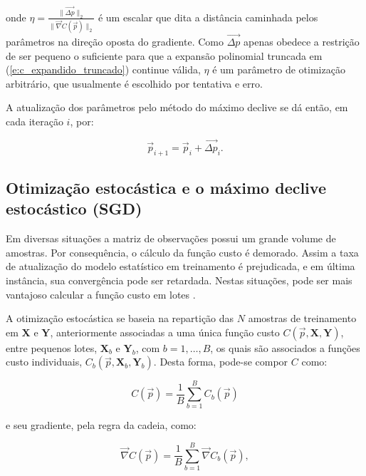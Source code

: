       \noindent onde $\eta = \frac{\|\vec{\Delta p}\|_2}{\|\vec{\nabla} C(\vec{p})\|_2}$ é um escalar que dita a distância caminhada pelos parâmetros na direção oposta do gradiente. Como $\vec{\Delta p}$ apenas obedece a restrição de ser pequeno o suficiente para que a expansão polinomial truncada em (\ref{e:c_expandido_truncado}) continue válida, $\eta$ é um parâmetro de otimização arbitrário, que usualmente é escolhido por tentativa e erro.

      A atualização dos parâmetros pelo método do máximo declive se dá então, em cada iteração $i$, por:

      \begin{equation} \label{e:pnew_maximo_declive}
        \vec{p}_{i+1} = \vec{p}_i + \vec{\Delta p}_i
        .
      \end{equation}


    \subsection{Otimização estocástica e o máximo declive estocástico (SGD)} \label{s:maximo_declive_estocastico}

      Em diversas situações a matriz de observações possui um grande volume de amostras. Por consequência, o cálculo da função custo é demorado. Assim a taxa de atualização do modelo estatístico em treinamento é prejudicada, e em última instância, sua convergência pode ser retardada. Nestas situações, pode ser mais vantajoso calcular a função custo em lotes .

      A otimização estocástica se baseia na repartição das $N$ amostras de treinamento em $\boldsymbol{X}$ e $\boldsymbol{Y}$, anteriormente associadas a uma única função custo $C(\vec{p}, \boldsymbol{X}, \boldsymbol{Y})$, entre pequenos lotes, $\boldsymbol{X}_b$ e $\boldsymbol{Y}_b$, com $b=1,\ldots,B$, os quais são associados a funções custo individuais, $C_b(\vec{p}, \boldsymbol{X}_b, \boldsymbol{Y}_b)$. Desta forma, pode-se compor $C$ como:


      \begin{equation} \label{e:custo_estocastico}
        C(\vec{p}) = \frac{1}{B} \sum \limits_{b=1}^B C_b(\vec{p})
      \end{equation}

      \noindent e seu gradiente, pela regra da cadeia, como:

      \begin{equation} \label{e:gradiente_estocastico}
        \vec{\nabla} C(\vec{p}) = \frac{1}{B} \sum \limits_{b=1}^B \vec{\nabla} C_b(\vec{p})
        ,
      \end{equation}

